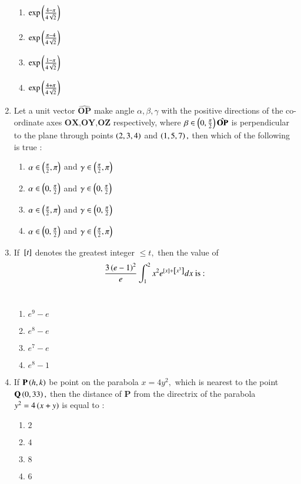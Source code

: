 \documentclass[journal,12pt,twocolumn]{IEEEtran}
\theoremstyle{remark}
\begin{document}
\begin{enumerate}
    \begin{enumerate}
        \item $\exp\left({\frac{4-\pi}{4\sqrt{2}}}\right)$
        \item $\exp\left({\frac{\pi-4}{4\sqrt{2}}}\right)$
        \item $\exp\left({\frac{1-\pi}{4\sqrt{2}}}\right)$
        \item $\exp\left({\frac{4+\pi}{4\sqrt{2}}}\right)$
    \end{enumerate}
    \item Let a unit vector $\hat{\textbf{OP}}$ make angle $\alpha,\beta,\gamma$ with the positive directions of the co-ordinate axes $\textbf{OX,OY,OZ}$ respectively, where $\beta \in \left(0,\frac{\pi}{2}\right)\hat{\textbf{OP}}$ is perpendicular to the plane through points $\left(2,3,4\right)$ and $\left(1,5,7\right),$ then which of the following is true $:$\\
    \begin{enumerate}
        \item $\alpha\in\left(\frac{\pi}{2},\pi\right)$ and $\gamma\in\left(\frac{\pi}{2},\pi\right)$
        \item $\alpha\in\left(0,\frac{\pi}{2}\right)$ and $\gamma\in\left(0,\frac{\pi}{2}\right)$
        \item $\alpha\in\left(\frac{\pi}{2},\pi\right)$ and $\gamma\in\left(0,\frac{\pi}{2}\right)$
        \item $\alpha\in\left(0,\frac{\pi}{2}\right)$ and $\gamma\in\left(\frac{\pi}{2},\pi\right)$
    \end{enumerate}
    \item If ${}\left[t\right]$ denotes the greatest integer $\le t,$ then the value of $$\frac{3\left(e-1\right)^2}{e}\int_1^2x^2e^{{}\left[x\right]+{}\left[x^3\right]}dx \text{ is :}$$\\
    \begin{enumerate}
        \item $e^9-e$
        \item $e^8-e$
        \item $e^7-e$
        \item $e^8-1$
    \end{enumerate}
    \item If $\textbf{P}\left(h,k\right)$ be point on the parabola $x=4y^2,$ which is nearest to the point $\textbf{Q}\left(0,33\right),$ then the distance of $\textbf{P}$ from the directrix of the parabola $y^2=4\left(x+y\right)$ is equal to $:$\\
    \begin{enumerate}
        \item $2$
        \item $4$
        \item $8$
        \item $6$
    \end{enumerate}
\end{enumerate}
\end{document}
